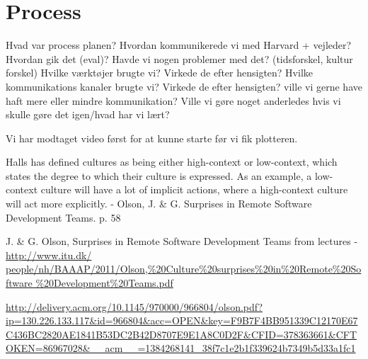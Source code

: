
\section{Process}

Hvad var process planen?
Hvordan kommunikerede vi med Harvard + vejleder?
Hvordan gik det (eval)?
Havde vi nogen problemer med det? (tidsforskel, kultur forskel)
Hvilke værktøjer brugte vi?
Virkede de efter hensigten?
Hvilke kommunikations kanaler brugte vi?
Virkede de efter hensigten? ville vi gerne have haft mere eller mindre kommunikation?
Ville vi gøre noget anderledes hvis vi skulle gøre det igen/hvad har vi lært?

Vi har modtaget video først for at kunne starte før vi fik plotteren.

Halls has defined cultures as being either high-context or low-context, which states the degree to which their culture is expressed. As an example, a low-context culture will have a lot of implicit actions, where a high-context culture will act more explicitly.
- Olson, J. \& G. Surprises in Remote Software Development Teams. p. 58

J. \& G. Olson, Surprises in Remote Software Development Teams from lectures - \url{http://www.itu.dk/ people/nh/BAAAP/2011/Olson,%20Culture%20surprises%20in%20Remote%20Software %20Development%20Teams.pdf}

\url{http://delivery.acm.org/10.1145/970000/966804/olson.pdf?ip=130.226.133.117&id=966804&acc=OPEN&key=F9B7F4BB951339C12170E67C436BC2820AE1841B53DC2B42D8707E9E1A8C0D2F&CFID=378363661&CFTOKEN=86967028&__acm__=1384268141_38f7c1e2b1f339624b7349b5d33a1fc1}
